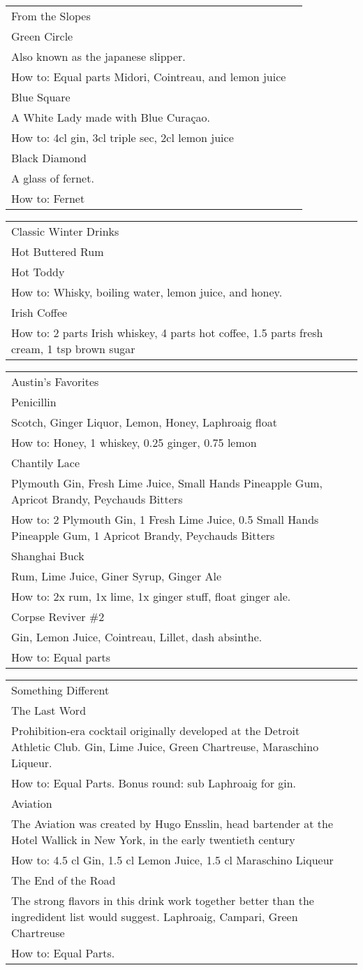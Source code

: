 \documentclass[12pt]{article}
\makeatletter
\newcommand*\ColText[1]{\textcolor{DarkColor}{#1}}
\newenvironment{Group}[1]
  {\noindent\begin{tabular*}{\textwidth}{@{}p{.8\linewidth}@{\extracolsep{\fill}}r@{}}
    {\fontsize{24}{29}\selectfont\ColText{#1}}\\[0.8em]}
  {\end{tabular*}}
\newcommand*\Entry[1]{%
  \sffamily#1 \\
}
\newcommand*\Expl[1]{
  \hspace*{1em}\footnotesize #1 \\
}
\newcommand*\HowTo[1]{
  \hspace*{1em}\footnotesize How to: \hspace*{1em}#1 \\
}
\makeatother
\begin{document}
\begin{Group}{From the Slopes}

\Entry{Green Circle}
\Expl{Also known as the japanese slipper.}
\HowTo{Equal parts Midori, Cointreau, and lemon juice}

\Entry{Blue Square}
\Expl{A White Lady made with Blue Curaçao.}
\HowTo{4cl gin, 3cl triple sec, 2cl lemon juice}

\Entry{Black Diamond}
\Expl{A glass of fernet.}
\HowTo{Fernet}

\end{Group}

\vfill

\begin{Group}{Classic Winter Drinks}
\Entry{Hot Buttered Rum}

\Entry{Hot Toddy}
\HowTo{Whisky, boiling water, lemon juice, and honey.}

\Entry{Irish Coffee}
\HowTo{2 parts Irish whiskey, 4 parts hot coffee, 1.5 parts fresh cream, 1 tsp brown sugar}

\end{Group}

\vfill

\begin{Group}{Austin's Favorites}

\Entry{Penicillin}
\Expl{Scotch, Ginger Liquor, Lemon, Honey, Laphroaig float}
\HowTo{Honey, 1 whiskey, 0.25 ginger, 0.75 lemon}

\Entry{Chantily Lace}
\Expl{Plymouth Gin, Fresh Lime Juice, Small Hands Pineapple Gum, Apricot Brandy, Peychauds Bitters}
\HowTo{2 Plymouth Gin, 1 Fresh Lime Juice, 0.5 Small Hands Pineapple Gum, 1 Apricot Brandy, Peychauds Bitters}

\Entry{Shanghai Buck}
\Expl{Rum, Lime Juice, Giner Syrup, Ginger Ale}
\HowTo{2x rum, 1x lime, 1x ginger stuff, float ginger ale.}

\Entry{Corpse Reviver \#2}
\Expl{Gin, Lemon Juice, Cointreau, Lillet, dash absinthe.}
\HowTo{Equal parts}

\end{Group}


\vfill


\begin{Group}{Something Different}
	
\Entry{The Last Word}
\Expl{Prohibition-era cocktail originally developed at the Detroit Athletic Club. Gin, Lime Juice, Green Chartreuse, Maraschino Liqueur.}
\HowTo{Equal Parts. Bonus round: sub Laphroaig for gin.}

\Entry{Aviation}
\Expl{The Aviation was created by Hugo Ensslin, head bartender at the Hotel Wallick in New York, in the early twentieth century}
\HowTo{4.5 cl Gin, 1.5 cl Lemon Juice, 1.5 cl Maraschino Liqueur}

\Entry{The End of the Road}
\Expl{The strong flavors in this drink work together better than the ingredident list would suggest. Laphroaig, Campari, Green Chartreuse}
\HowTo{Equal Parts.}

\end{Group}
\end{document}
